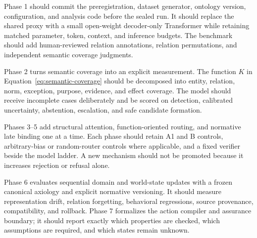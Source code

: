 Phase 1 should commit the preregistration, dataset generator, ontology version, configuration, and analysis code before the sealed run. It should replace the shared proxy with a small open-weight decoder-only Transformer while retaining matched parameter, token, context, and inference budgets. The benchmark should add human-reviewed relation annotations, relation permutations, and independent semantic coverage judgments.

Phase 2 turns semantic coverage into an explicit measurement. The function $K$ in Equation~\ref{eq:semantic-coverage} should be decomposed into entity, relation, norm, exception, purpose, evidence, and effect coverage. The model should receive incomplete cases deliberately and be scored on detection, calibrated uncertainty, abstention, escalation, and safe candidate formation.

Phases 3--5 add structural attention, function-oriented routing, and normative late binding one at a time. Each phase should retain A1 and B controls, arbitrary-bias or random-router controls where applicable, and a fixed verifier beside the model ladder. A new mechanism should not be promoted because it increases rejection or refusal alone.

Phase 6 evaluates sequential domain and world-state updates with a frozen canonical axiology and explicit normative versioning. It should measure representation drift, relation forgetting, behavioral regressions, source provenance, compatibility, and rollback. Phase 7 formalizes the action compiler and assurance boundary; it should report exactly which properties are checked, which assumptions are required, and which states remain unknown.
